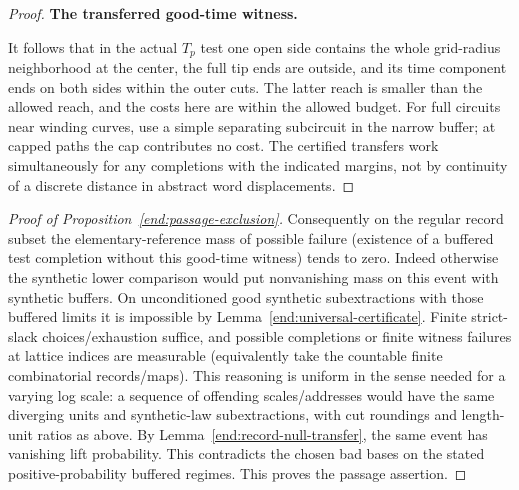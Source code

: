 \begin{proof}
\smallskip
\noindent\textbf{The transferred good-time witness.}\quad

It follows that in the actual \(T_p\) test one open side contains the whole grid-radius
neighborhood at the center, the full tip ends are outside, and its time component ends on
both sides within the outer cuts. The latter reach is smaller than the allowed reach, and
the costs here are within the allowed budget. For full circuits near winding curves, use a
simple separating subcircuit in the narrow buffer; at capped paths the cap contributes no
cost. The certified transfers work simultaneously for any completions with the indicated
margins, not by continuity of a discrete distance in abstract word displacements.

\end{proof}

\begin{proof}[Proof of Proposition~\ref{end:passage-exclusion}]

Consequently on the regular record subset the elementary-reference mass of possible
failure (existence of a buffered test completion without this good-time witness) tends to
zero. Indeed otherwise the synthetic lower comparison would put nonvanishing mass on this
event with synthetic buffers. On unconditioned good synthetic subextractions with those
buffered limits it is impossible by Lemma~\ref{end:universal-certificate}.
Finite strict-slack choices/exhaustion suffice, and possible completions or finite witness
failures at lattice indices are measurable (equivalently take the countable finite
combinatorial records/maps). This reasoning is uniform in the sense needed for a varying
log scale: a sequence of offending scales/addresses would have the same diverging units
and synthetic-law subextractions, with cut roundings and length-unit ratios as above.
By Lemma~\ref{end:record-null-transfer}, the same event has vanishing lift
probability. This contradicts the chosen bad bases on the stated
positive-probability buffered regimes. This proves the passage assertion.

\end{proof}

